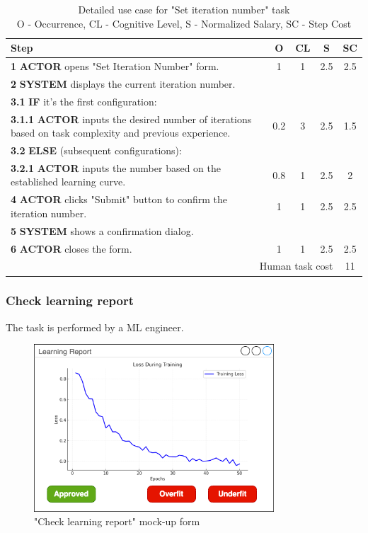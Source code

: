 \begin{table}[H]
\centering
\begin{tabularx}{\textwidth}{|X|c|c|c|c|}
\hline
\textbf{Step} & \textbf{O} & \textbf{CL} & \textbf{S} & \textbf{SC} \\
\hline
\textbf{1} \textbf{ACTOR} opens "Set Iteration Number" form. & 1 & 1 & 2.5 & 2.5 \\
\hline
\textbf{2} \textbf{SYSTEM} displays the current iteration number. & & & & \\
\hline
\textbf{3.1} \textbf {IF} it's the first configuration: &  &  &  & \\
\hline
\textbf{3.1.1} \textbf {ACTOR} inputs the desired number of iterations based on task complexity and previous experience. & 0.2 & 3 & 2.5 & 1.5 \\
\hline
\textbf{3.2} \textbf {ELSE} (subsequent configurations): & & & & \\
\hline
\textbf{3.2.1} \textbf{ACTOR} inputs the number based on the established learning curve. & 0.8&1 &2.5 &2 \\
\hline
\textbf{4} \textbf{ACTOR} clicks "Submit" button to confirm the iteration number. & 1 & 1 & 2.5 & 2.5 \\
\hline
\textbf{5} \textbf{SYSTEM} shows a confirmation dialog. & & & & \\
\hline
\textbf{6} \textbf{ACTOR} closes the form. & 1 & 1 & 2.5 & 2.5 \\
\hline
\multicolumn{4}{|r|}{Human task cost} & 11\\
\hline
\end{tabularx}
\caption{Detailed use case for "Set iteration number" task\\ 
O - Occurrence, CL - Cognitive Level, S - Normalized Salary, SC - Step Cost}
\label{table:set_iteration_number}
\end{table}

\subsubsection{Check learning report}

The task is performed by a ML engineer.

\begin{figure}[H]
\centering
\includegraphics[width=0.8\textwidth]{figures/check_learning_report.png}
\caption{"Check learning report" mock-up form}
\end{figure}

